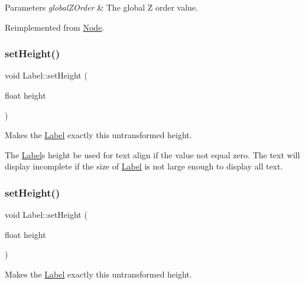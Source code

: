 \begin{DoxyParams}{Parameters}
{\em global\+Z\+Order} & The global Z order value. \\
\hline
\end{DoxyParams}


Reimplemented from \hyperlink{classNode_a32a5b9cb9a408d04008c4935a4776566}{Node}.

\mbox{\label{classLabel_a71ad7b5b1bd01d2d903a560cf33f151d}} 
\subsubsection{\texorpdfstring{set\+Height()}{setHeight()}\hspace{0.1cm}{\footnotesize\ttfamily [1/2]}}
{\footnotesize\ttfamily void Label\+::set\+Height (\begin{DoxyParamCaption}\item[{float}]{height }\end{DoxyParamCaption})\hspace{0.3cm}{\ttfamily [inline]}}

Makes the \hyperlink{classLabel}{Label} exactly this untransformed height.

The \hyperlink{classLabel}{Label}\textquotesingle{}s height be used for text align if the value not equal zero. The text will display incomplete if the size of \hyperlink{classLabel}{Label} is not large enough to display all text. \mbox{\label{classLabel_a71ad7b5b1bd01d2d903a560cf33f151d}} 
\subsubsection{\texorpdfstring{set\+Height()}{setHeight()}\hspace{0.1cm}{\footnotesize\ttfamily [2/2]}}
{\footnotesize\ttfamily void Label\+::set\+Height (\begin{DoxyParamCaption}\item[{float}]{height }\end{DoxyParamCaption})\hspace{0.3cm}{\ttfamily [inline]}}

Makes the \hyperlink{classLabel}{Label} exactly this untransformed height.

